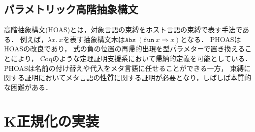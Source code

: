 \documentclass[T]{compsoft}
\begin{document}
%
%

\subsection{パラメトリック高階抽象構文}
高階抽象構文(HOAS)とは，対象言語の束縛をホスト言語の束縛で表す手法である．
例えば，$\lambda x.~x$を表す抽象構文木は$\texttt{Abs}~(\texttt{fun}~x \Rightarrow x)$となる．
PHOAS\cite{Chlipala:2008:PHA:1411204.1411226}はHOASの改良であり，
式の負の位置の再帰的出現を型パラメターで置き換えることにより，
Coqのような定理証明支援系において帰納的定義を可能としている．
PHOASは名前の付け替えや代入をメタ言語に任せることができる一方，
束縛に関する証明においてメタ言語の性質に関する証明が必要となり，しばしば本質的な困難がある．

%

\section{K正規化の実装}\label{section:knormal-implement}
\end{document}
